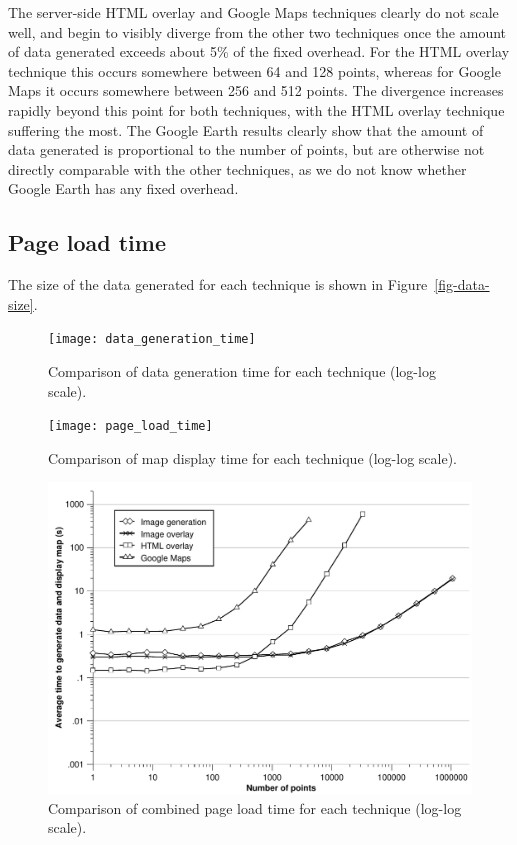 \documentclass[acmtocl,acmnow]{acmtrans2m}
\begin{document}
The server-side HTML overlay and Google Maps techniques clearly do not
scale well, and begin to visibly diverge from the other two techniques
once the amount of data generated exceeds about 5\% of the fixed
overhead. For the HTML overlay technique this occurs somewhere between
64 and 128 points, whereas for Google Maps it occurs somewhere between
256 and 512 points. The divergence increases rapidly beyond this point
for both techniques, with the HTML overlay technique suffering the most.
The Google Earth results clearly show that the amount of data generated
is proportional to the number of points, but are otherwise not directly
comparable with the other techniques, as we do not know whether Google
Earth has any fixed overhead.


\subsection{Page load time}

The size of the data generated for each technique is shown in
Figure~\ref{fig-data-size}.


\begin{figure}
	\texttt{[image: data\_generation\_time]}
	\caption{Comparison of data generation time for each technique (log-log scale).}
	\label{fig-data-generation-time}
\end{figure}


\begin{figure}
	\centering
	\texttt{[image: page\_load\_time]}
	\caption{Comparison of map display time for each technique (log-log scale).}
	\label{fig-page-load-time}
\end{figure}


\begin{figure}
	\centering
	\includegraphics[scale=0.66]{combined_time}
	\caption{Comparison of combined page load time for each technique (log-log scale).}
	\label{fig-combined-time}
\end{figure}
\end{document}
